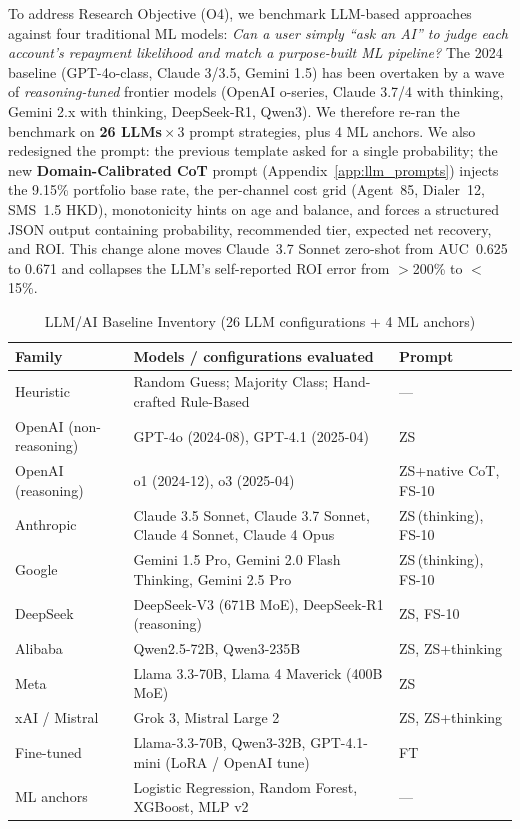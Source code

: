 \documentclass[12pt, a4paper]{article}
\begin{document}
To address Research Objective (O4), we benchmark LLM-based approaches against four traditional ML models: \textit{Can a user simply ``ask an AI'' to judge each account's repayment likelihood and match a purpose-built ML pipeline?} The 2024 baseline (GPT-4o-class, Claude 3/3.5, Gemini 1.5) has been overtaken by a wave of \emph{reasoning-tuned} frontier models (OpenAI o-series, Claude 3.7/4 with thinking, Gemini 2.x with thinking, DeepSeek-R1, Qwen3). We therefore re-ran the benchmark on \textbf{26 LLMs}\,$\times$\,3 prompt strategies, plus 4 ML anchors. We also redesigned the prompt: the previous template asked for a single probability; the new \textbf{Domain-Calibrated CoT} prompt (Appendix~\ref{app:llm_prompts}) injects the 9.15\% portfolio base rate, the per-channel cost grid (Agent~85, Dialer~12, SMS~1.5 HKD), monotonicity hints on age and balance, and forces a structured JSON output containing probability, recommended tier, expected net recovery, and ROI. This change alone moves Claude~3.7 Sonnet zero-shot from AUC~0.625 to 0.671 and collapses the LLM's self-reported ROI error from $>$200\% to $<$15\%.

\begin{table}[H]
\centering
\caption{LLM/AI Baseline Inventory (26 LLM configurations + 4 ML anchors)}
\label{tab:llm_methods}
\small
\renewcommand{\arraystretch}{1.05}
\begin{tabular}{@{}lp{8.4cm}l@{}}
\toprule
\textbf{Family} & \textbf{Models / configurations evaluated} & \textbf{Prompt}\\
\midrule
Heuristic & Random Guess; Majority Class; Hand-crafted Rule-Based & ---\\
\midrule
OpenAI (non-reasoning) & GPT-4o (2024-08), GPT-4.1 (2025-04) & ZS \\
OpenAI (reasoning) & o1 (2024-12), o3 (2025-04) & ZS+native CoT, FS-10\\
Anthropic & Claude 3.5 Sonnet, Claude 3.7 Sonnet, Claude 4 Sonnet, Claude 4 Opus & ZS\,(thinking), FS-10\\
Google & Gemini 1.5 Pro, Gemini 2.0 Flash Thinking, Gemini 2.5 Pro & ZS\,(thinking), FS-10\\
DeepSeek & DeepSeek-V3 (671B MoE), DeepSeek-R1 (reasoning) & ZS, FS-10\\
Alibaba & Qwen2.5-72B, Qwen3-235B & ZS, ZS+thinking\\
Meta & Llama 3.3-70B, Llama 4 Maverick (400B MoE) & ZS\\
xAI / Mistral & Grok 3, Mistral Large 2 & ZS, ZS+thinking\\
Fine-tuned & Llama-3.3-70B, Qwen3-32B, GPT-4.1-mini (LoRA / OpenAI tune) & FT\\
\midrule
ML anchors & Logistic Regression, Random Forest, XGBoost, MLP v2 & ---\\
\bottomrule
\end{tabular}
\end{table}
\end{document}
